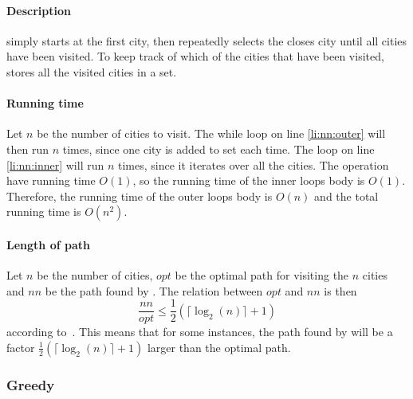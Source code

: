 \paragraph{Description}  simply starts at the first 
city, then repeatedly selects the closes city until all cities have been
visited. To keep track of which of the cities that have been visited,
 stores all the visited cities in a set.
\paragraph{Running time}
Let $n$ be the number of cities to visit. The while loop on line
\ref{li:nn:outer} will then run $n$ times, since one city is added to set
 each time. The loop on line \ref{li:nn:inner} will run $n$ times,
since it iterates over all the cities. The  operation have
running time $O(1)$, so the running time of the inner loops body is $O(1)$.
Therefore, the running time of the outer loops body is $O(n)$ and the total
running time is $O(n^2)$.
\paragraph{Length of path}
Let $n$ be the number of cities, $opt$ be the optimal path for visiting the $n$
cities and $nn$ be the path
found by . The relation between $opt$ and $nn$ is then
\[\frac{nn}{opt} \leq \frac{1}{2}(\lceil \log_2(n) \rceil + 1)\]
according to~\cite{johnson}. This means that for some instances, the path found
by  will be a factor 
$\frac{1}{2}(\lceil \log_2(n) \rceil + 1)$ larger than the optimal path.

\clearpage

\subsubsection{Greedy}
